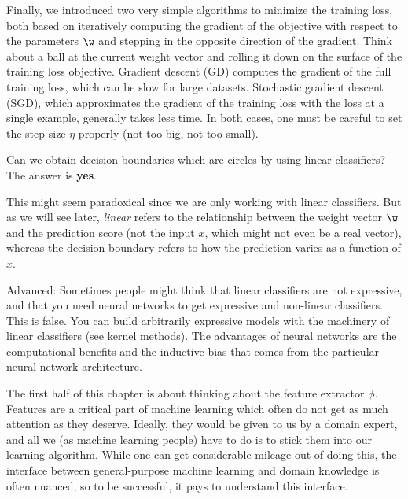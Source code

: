 Finally, we introduced two very simple algorithms to minimize the training loss,
both based on iteratively computing the gradient of the objective with respect to the parameters $\w$ and stepping in the opposite direction of the gradient.
Think about a ball at the current weight vector and rolling it down on the surface of the training loss objective.
% 
Gradient descent (GD) computes the gradient of the full training loss, which can be slow for large datasets.
% 
Stochastic gradient descent (SGD), which approximates the gradient of the training loss with the loss at a single example, generally takes less time.
% 
In both cases, one must be careful to set the step size $\eta$ properly (not too big, not too small).


\begin{example}
	Can we obtain decision boundaries which are circles by using linear classifiers? 
	The answer is \textbf{yes}.

	This might seem paradoxical since we are only working with linear classifiers.
	But as we will see later, \textit{linear} refers to the relationship between the
	weight vector $\w$ and the prediction score (not the input $x$, which might not even be a real vector),
	whereas the decision boundary refers to how the prediction varies as a function of $x$.

	Advanced: Sometimes people might think that linear classifiers are not expressive,
	and that you need neural networks to get expressive and non-linear classifiers.
	This is false.
	You can build arbitrarily expressive models with the machinery of linear classifiers (see kernel methods).
	The advantages of neural networks are the computational benefits and the inductive bias that comes from the particular neural network architecture.
\end{example}

The first half of this chapter is about thinking about the feature extractor $\phi$. %
Features are a critical part of machine learning which often do not get as much attention as they deserve.
Ideally, they would be given to us by a domain expert,
and all we (as machine learning people) have to do is to stick them into our learning algorithm.
While one can get considerable mileage out of doing this,
the interface between general-purpose machine learning and domain knowledge is often nuanced,
so to be successful, it pays to understand this interface.

